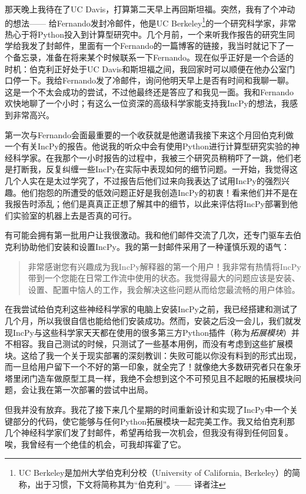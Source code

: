 \documentclass[letter,12pt]{book}
\begin{document}
\begin{CJK}{UTF8}{gbsn}
那天晚上我待在了UC Davis，打算第二天早上再回斯坦福。突然，我有了个冲动的想法—— 给Fernando发封冷邮件，他是UC Berkeley\footnote{UC Berkeley是加州大学伯克利分校（University of California, Berkeley）的简称，出于习惯，下文将简称其为“伯克利”。—— 译者注}的一个研究科学家，非常热心于将Python投入到计算型研究中。几个月前，一个来听我作报告的研究生同学给我发了封邮件，里面有一个Fernando的一篇博客的链接，我当时就记下了一个备忘录，准备在将来某个时候联系一下Fernando。现在似乎正好是一个合适的时机：伯克利正好处于UC Davis和斯坦福之间，我回家时可以顺便在他办公室门口停一下。我给Fernando发了冷邮件，询问他明天早上是否有时间和我聊一聊。这是一个不太会成功的尝试，不过他最终还是答应了和我见一面。我和Fernando欢快地聊了一个小时；有这么一位资深的高级科学家能支持我IncPy的想法，我感到非常高兴。

第一次与Fernando会面最重要的一个收获就是他邀请我接下来这个月回伯克利做一个有关IncPy的报告。他说我的听众中会有使用Python进行计算型研究实验的神经科学家。在我那个一小时报告的过程中，我被三个研究员稍稍吓了一跳，他们老是打断我，反复纠缠一些IncPy在实际中表现如何的细节问题。一开始，我觉得这几个人实在是太过学究了，不过报告后他们过来向我表达了试用IncPy的强烈兴趣。他们抱怨的所遭受的低效问题正好是我创造IncPy的初衷！看来他们并不是在我报告时添乱；他们是真真正正想了解其中的细节，以此来评估将IncPy部署到他们实验室的机器上去是否真的可行。

有可能会拥有第一批用户让我很激动。我和他们邮件交流了几次，还专门驱车去伯克利协助他们安装和设置IncPy。我的第一封邮件采用了一种谨慎乐观的语气：
\begin{quote}
  非常感谢您有兴趣成为我IncPy解释器的第一个用户！我非常有热情将IncPy带到一个您能在日常工作流中使用的状态。我觉得最大的问题应该是安装、设置、配置中恼人的工作，我会解决这些问题从而给您最流畅的用户体验。
\end{quote}

在我尝试给伯克利这些神经科学家的电脑上安装IncPy之前，我已经搭建和测试了几个月，所以我很自信也能给他们安装成功。然而，安装之后没一会儿，我们就发现IncPy与这些科学家天天都在使用的很多第三方Python插件（称为\emph{拓展模块}）并不相容。我自己测试的时候，只测试了一些基本用例，而没有考虑到这些扩展模块。这给了我一个关于现实部署的深刻教训：失败可能以你没有料到的形式出现，而一旦给用户留下一个不好的第一印象，就全完了！就像绝大多数研究者只在象牙塔里闭门造车做原型工具一样，我绝不会想到这个不可预见且不起眼的拓展模块问题，会让我在第一次部署的尝试中出局。

但我并没有放弃。我花了接下来几个星期的时间重新设计和实现了IncPy中一个关键部分的代码，使它能够与任何Python拓展模块一起完美工作。我又给伯克利那几个神经科学家们发了封邮件，希望再给我一次机会，但我没有得到任何回复。唉，我曾经有一个绝佳的机会，可我却挥霍了它。


\end{CJK}
\end{document}
